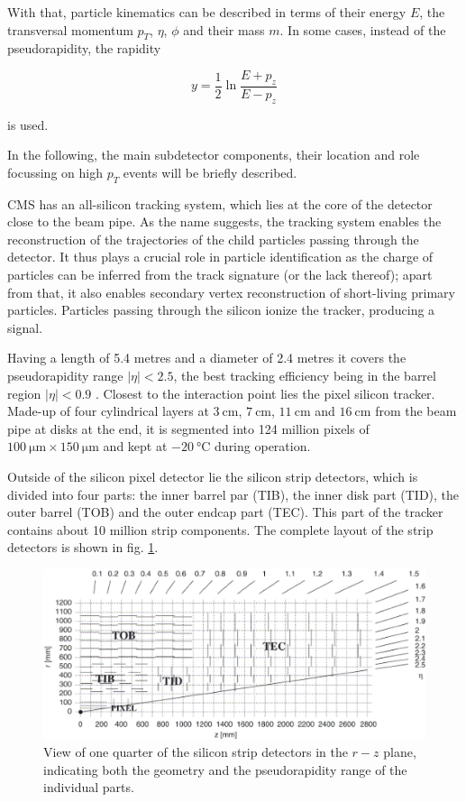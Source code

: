 With that, particle kinematics can be described in terms of their energy $E$, the transversal momentum $p_T$, $\eta$, $\phi$ and their mass $m$. In some cases, instead of the pseudorapidity, the rapidity

\begin{equation*}
	y = \frac{1}{2}\ln\frac{E+p_z}{E-p_z}
\end{equation*}

is used.

In the following, the main subdetector components, their location and role focussing on high $p_T$ events will be briefly described.


CMS has an all-silicon tracking system, which lies at the core of the detector close to the beam pipe. As the name suggests, the tracking system enables the reconstruction of the trajectories of the child particles passing through the detector. It thus plays a crucial role in particle identification as the charge of particles can be inferred from the track signature (or the lack thereof); apart from that, it also enables secondary vertex reconstruction of short-living primary particles. Particles passing through the silicon ionize the tracker, producing a signal.

Having a length of 5.4 metres and a diameter of 2.4 metres it covers the pseudorapidity range $|\eta|<2.5$, the best tracking efficiency being in the barrel region $|\eta| < 0.9$ \cite{Veszpremi_2014}. Closest to the interaction point lies the pixel silicon tracker. Made-up of four cylindrical layers at $\SI{3}{\centi\meter}$, $\SI{7}{\centi\meter}$, $\SI{11}{\centi\meter}$ and $\SI{16}{\centi\meter}$ from the beam pipe at disks at the end, it is segmented into 124 million pixels of $\SI{100}{\micro\meter} \times \SI{150}{\micro\meter}$ and kept at $\SI{-20}{\degreeCelsius}$ during operation.

Outside of the silicon pixel detector lie the silicon strip detectors, which is divided into four parts: the inner barrel par (TIB), the inner disk part (TID), the outer barrel (TOB) and the outer endcap part (TEC). This part of the tracker contains about 10 million strip components. The complete layout of the strip detectors is shown in fig. \ref{fig:strip_tracker}.

\begin{figure}[h!]
	\centering
	\includegraphics[width=0.8\linewidth]{figures/theoryexperiment/StripTracker}
	\caption{View of one quarter of the silicon strip detectors in the $r-z$ plane, indicating both the geometry and the pseudorapidity range of the individual parts. \cite{Azzurri:914891}}
	\label{fig:strip_tracker}
\end{figure}

